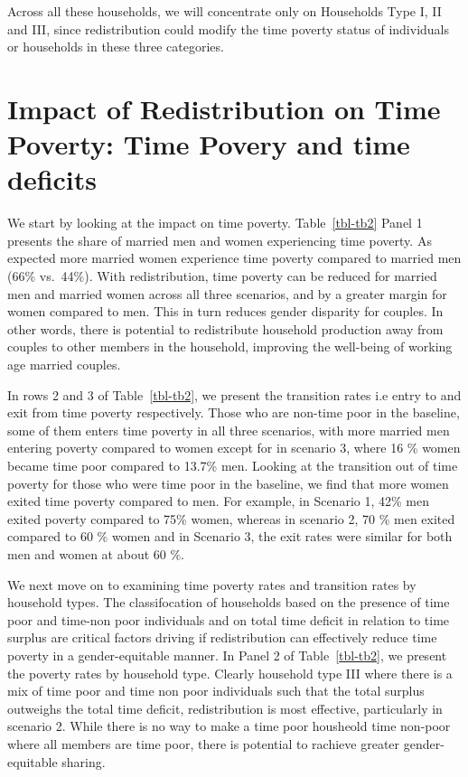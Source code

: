 \documentclass[
  11pt,
]{article}
\begin{document}
Across all these households, we will concentrate only on Households Type
I, II and III, since redistribution could modify the time poverty status
of individuals or households in these three categories.

\section{Impact of Redistribution on Time Poverty: Time Povery and time
deficits}\label{impact-of-redistribution-on-time-poverty-time-povery-and-time-deficits}

We start by looking at the impact on time poverty. Table~\ref{tbl-tb2}
Panel 1 presents the share of married men and women experiencing time
poverty. As expected more married women experience time poverty compared
to married men (66\% vs.~44\%). With redistribution, time poverty can be
reduced for married men and married women across all three scenarios,
and by a greater margin for women compared to men. This in turn reduces
gender disparity for couples. In other words, there is potential to
redistribute household production away from couples to other members in
the household, improving the well-being of working age married couples.

In rows 2 and 3 of Table~\ref{tbl-tb2}, we present the transition rates
i.e entry to and exit from time poverty respectively. Those who are
non-time poor in the baseline, some of them enters time poverty in all
three scenarios, with more married men entering poverty compared to
women except for in scenario 3, where 16 \% women became time poor
compared to 13.7\% men. Looking at the transition out of time poverty
for those who were time poor in the baseline, we find that more women
exited time poverty compared to men. For example, in Scenario 1, 42\%
men exited poverty compared to 75\% women, whereas in scenario 2, 70 \%
men exited compared to 60 \% women and in Scenario 3, the exit rates
were similar for both men and women at about 60 \%.

We next move on to examining time poverty rates and transition rates by
household types. The classifocation of households based on the presence
of time poor and time-non poor individuals and on total time deficit in
relation to time surplus are critical factors driving if redistribution
can effectively reduce time poverty in a gender-equitable manner. In
Panel 2 of Table~\ref{tbl-tb2}, we present the poverty rates by
household type. Clearly household type III where there is a mix of time
poor and time non poor individuals such that the total surplus outweighs
the total time deficit, redistribution is most effective, particularly
in scenario 2. While there is no way to make a time poor housheold time
non-poor where all members are time poor, there is potential to rachieve
greater gender-equitable sharing.
\end{document}
